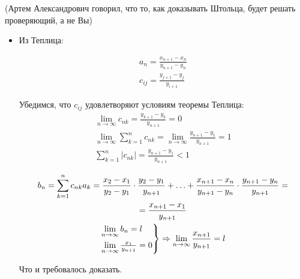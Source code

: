 \documentclass[14pt]{extarticle}
\numberwithin{equation}{section}
\begin{document}
    (Артем Александрович говорил, что то, как доказывать Штольца, будет решать проверяющий, а не Вы)

    \bigskip \bigskip

    \begin{itemize}
        \item
            Из Теплица:

            \begin{gather*}
                a_n = \frac{x_{n + 1} - x_n}{y_{n + 1} - y_n}
                \\
                c_{i j} = \frac{y_{j + 1} - y_j}{y_{i + 1}}
            \end{gather*}

            Убедимся, что \( c_{i j} \) удовлетворяют условиям теоремы Теплица:
            \begin{gather*}
                \lim\limits_{n \to \infty} c_{n k} = \frac{y_{k + 1} - y_k}{y_{n + 1}} = 0
                \\
                \lim\limits_{n \to \infty} \sum\limits_{k = 1}^{n} c_{n k}
                    = \lim\limits_{n \to \infty} \frac{y_{n + 1} - y_1}{y_{n + 1}}
                    = 1
                \\
                \sum\limits_{k = 1}^{n} |c_{n k}| = \frac{y_{n + 1} - y_1}{y_{n + 1}} < 1
            \end{gather*}

            \begin{gather*}
                b_n = \sum\limits_{k = 1}^{n} c_{nk} a_k
                    = \frac{x_2 - x_1}{y_2 - y_1} \cdot \frac{y_2 - y_1}{y_{n + 1}}
                    + \ldots
                    + \frac{x_{n + 1} - x_n}{y_{n + 1} - y_n} \cdot \frac{y_{n + 1} - y_n}{y_{n + 1}}
                    =
                \\
                = \frac{x_{n + 1} - x_1}{y_{n + 1}}
                \\
                \begin{rcases}
                    \lim\limits_{n \to \infty} b_n = l
                    \\
                    \lim\limits_{n \to \infty} \frac{x_1}{y_{n + 1}} = 0
                \end{rcases}
                \Rightarrow
                \lim\limits_{n \to \infty} \frac{x_{n + 1}}{y_{n + 1}} = l
            \end{gather*}

            Что и требовалось доказать.


\end{itemize}
\end{document}

